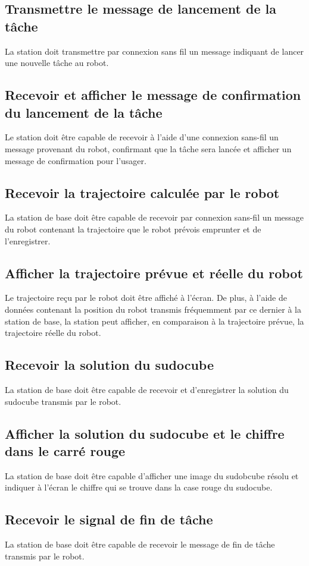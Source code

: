 \subsection{Transmettre le message de lancement de la tâche}
La station doit transmettre par connexion sans fil un message indiquant de lancer une nouvelle tâche au robot.
\subsection{Recevoir et afficher  le message de confirmation du lancement de la tâche}
Le station doit être capable de recevoir à l'aide d'une connexion sans-fil un message provenant du robot, confirmant que la tâche sera lancée et afficher un message de confirmation pour l'usager.
\subsection{Recevoir la trajectoire calculée par le robot}
La station de base doit être capable de recevoir par connexion sans-fil un message du robot contenant la trajectoire que le robot prévois emprunter et de l'enregistrer.
\subsection{Afficher la trajectoire prévue et réelle du robot}
Le trajectoire reçu par le robot doit être affiché à l'écran. De plus, à l'aide de données contenant la position du robot transmis fréquemment par ce dernier à la station de base, la station peut afficher, en comparaison à la trajectoire prévue, la trajectoire réelle du robot.
\subsection{Recevoir la solution du sudocube}
La station de base doit être capable de recevoir et d'enregistrer la solution du sudocube transmis par le robot.
\subsection{Afficher la solution du sudocube et le chiffre dans le carré rouge}
La station de base doit être capable d'afficher une image du sudobcube résolu et indiquer à l'écran le chiffre qui se trouve dans la case rouge du sudocube.
\subsection{Recevoir le signal de fin de tâche}
La station de base doit être capable de recevoir le message de fin de tâche transmis par le robot.
